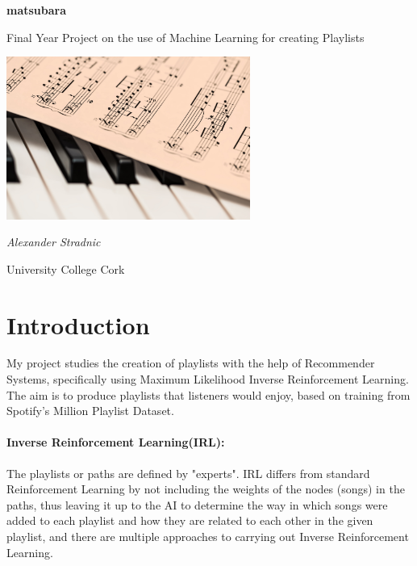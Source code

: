 \documentclass[a4paper, 12pt]{article}
\begin{document}
\begin{titlepage}
   \begin{center}
       \vspace*{1cm}

       \huge
       \textbf{matsubara}

       \vspace{1cm}

       Final Year Project on the use of Machine Learning for creating Playlists

        \vspace{3cm}

       \includegraphics[width=0.6\textwidth]{"piano.jpg"}

       \vfill

       \textit{Alexander Stradnic}

       \vspace{1cm}
       
       University College Cork

       \vspace*{1cm}


   \end{center}
\end{titlepage}

\tableofcontents
\newpage

\section{Introduction}
My project studies the creation of playlists with the help of Recommender Systems, specifically using Maximum Likelihood Inverse Reinforcement Learning.
The aim is to produce playlists that listeners would enjoy, based on training from Spotify's Million Playlist Dataset.

\paragraph{Inverse Reinforcement Learning(IRL):}
The playlists or paths are defined by "experts".
IRL differs from standard Reinforcement Learning by not including the weights of the nodes (songs) in the paths, thus leaving it up to the AI to determine the way in which songs were added to each playlist and how they are related to each other in the given playlist, and there are multiple approaches to carrying out Inverse Reinforcement Learning.
\end{document}
